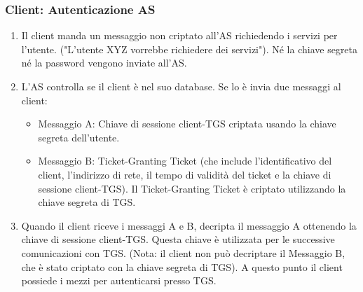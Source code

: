 \subsubsection{Client: Autenticazione AS}
\begin{enumerate}
    \item Il client manda un messaggio non criptato all'AS richiedendo i servizi per l'utente. ("L'utente XYZ vorrebbe richiedere dei servizi"). Né la chiave segreta né la password vengono inviate all'AS.
    
    \item L'AS controlla se il client è nel suo database. Se lo è invia due messaggi al client:
    
    \begin{itemize}
        \item Messaggio A: Chiave di sessione client-TGS criptata usando la chiave segreta dell'utente.
        
        \item Messaggio B: Ticket-Granting Ticket (che include l'identificativo del client, l'indirizzo di rete, il tempo di validità del ticket e la chiave di sessione client-TGS). Il Ticket-Granting Ticket è criptato utilizzando la chiave segreta di TGS.
    \end{itemize}
    
    \item Quando il client riceve i messaggi A e B, decripta il messaggio A ottenendo la chiave di sessione client-TGS. Questa chiave è utilizzata per le successive comunicazioni con TGS. (Nota: il client non può decriptare il Messaggio B, che è stato criptato con la chiave segreta di TGS). A questo punto il client possiede i mezzi per autenticarsi presso TGS.
\end{enumerate}
